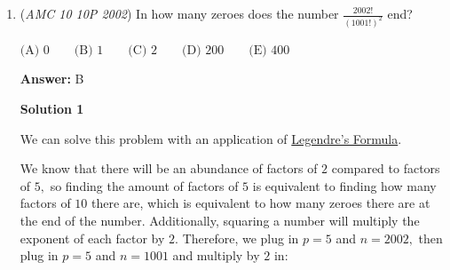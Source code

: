 \begin{enumerate}
 \textbf{Note} We can find a closed form expression for $f$ using this method. We have that 
 \[f(x) + 2f(\frac{2002}{x}) = 3x\] and plugging in $\frac{2002}{x}$ gives 
 \[f(\frac{2002}{x}) + 2f(x) = 3(\frac{2002}{x}).\]

 Let $a = f(x)$ and $b = f(\frac{2002}{x})$. Then, we have 
 \[a + 2b = 3x \tag{1}\] and 
 \[2a + b = \frac{6006}{x} \tag{2}\]

 We add equations $(1)$ and $(2)$ and divide by $3$ to get $a+b = x + \frac{2002}{x}$. Subtracting this from equation $(2)$ gives us the closed form 
 \[f(x) = \frac{4004}{x} - x\]

 Indeed, plugging in $x=2$ gives us $f(2) = \frac{4004}{2} - 2 = \boxed {\textbf{(B) }2000}$.

 



\textbf{Solution 2(Similar to Sol 1)}

Setting $x = 2$ in the given equation yields
 \[f(2) + 2f(1001) = 6.\]Setting $x = 1001$ gives
 \[2f(2) + f(1001) = 3003.\]

 Adding these two equations and dividing by $3$ results in
 \[f(2) + f(1001) = \frac{6 + 3003}{3} = 1003.\]

 We now have the system:\begin{align*}f(2) + f(1001) &= 1003 \\2f(2) + f(1001) &= 3003\end{align*}


 Subtracting the first equation from the second gives
 \[f(2) = 3003 - 1003 = 2000.\]

 Thus, $f(2) = \boxed{\textbf{(B) }2000}$.

 


	\item (\textit{AMC 10 10P 2002}) In how many zeroes does the number $\frac{2002!}{(1001!)^2}$ end?


 $\text{(A) }0 \qquad \text{(B) }1 \qquad \text{(C) }2 \qquad \text{(D) }200 \qquad \text{(E) }400$

 \textbf{Answer: }B



\textbf{Solution 1}

We can solve this problem with an application of \href{https://artofproblemsolving.com/wiki/index.php?title=Legendre\%27s\_Formula}{Legendre's Formula}. 

 We know that there will be an abundance of factors of $2$ compared to factors of $5,$ so finding the amount of factors of $5$ is equivalent to finding how many factors of $10$ there are, which is equivalent to how many zeroes there are at the end of the number. Additionally, squaring a number will multiply the exponent of each factor by $2.$ Therefore, we plug in $p=5$ and $n=2002,$ then plug in $p=5$ and $n=1001$ and multiply by $2$ in:


\end{enumerate}
